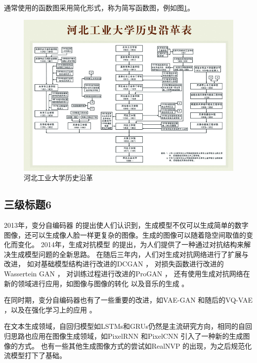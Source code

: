 通常使用的函数图采用简化形式，称为简写函数图，例如图{\ref{fig:historyhebut}}。
\begin{figure}[ht]
    \centering
    \includegraphics[width=\textwidth]{figures/historyhebut}
    \caption{河北工业大学历史沿革}\label{fig:historyhebut}
\end{figure}



\subsection{三级标题6}
2013年，变分自编码器 {\cite{kingma2013auto}}的提出使人们认识到，生成模型不仅可以生成简单的数字图像，还可以生成像人脸一样更复杂的图像。生成的图像可以随着隐空间取值的变化而变化。
2014年，生成对抗模型 {\cite{goodfellow2020generative}}的提出，为人们提供了一种通过对抗结构来解决生成模型问题的全新思路。
在随后三年内，人们对生成对抗网络进行了扩展与改进，
如对基础模型结构进行改进的DCGAN {\cite{radford2015unsupervised}}，
对损失函数进行改进的Wassertein GAN {\cite{arjovsky2017wasserstein}}，
对训练过程进行改进的ProGAN {\cite{karras2017progressive}}，
还有使用生成对抗网络在新的领域进行应用，如图像与图像的转化 {\cite{isola2017image}\cite{zhu2017unpaired}}以及音乐的生成 {\cite{dong2018musegan}}。

在同时期，变分自编码器也有了一些重要的改进，如VAE-GAN {\cite{larsen2016autoencoding}}和随后的VQ-VAE {\cite{razavi2019generating}}，以及在强化学习上的应用 {\cite{ha2018world}}。

在文本生成领域，自回归模型如LSTMs和GRUs仍然是主流研究方向，相同的自回归思路也应用在图像生成领域，如PixelRNN {\cite{van2016pixel}}和PixelCNN {\cite{van2016conditional}}引入了一种新的生成图像的方式。
也有一些其他生成图像方式的尝试如RealNVP {\cite{dinh2016density}}的出现，为之后规范化流模型打下了基础。

